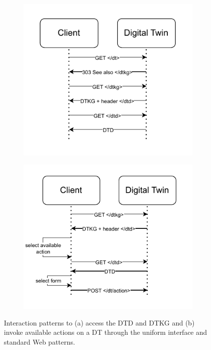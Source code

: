 \begin{figure}
    \centering
    \begin{subfigure}[t]{0.45\columnwidth}
        \centering
        \includegraphics[width=\textwidth]{figures/hwodt/dtddtkg.pdf}
        \caption{}
        \label{fig:sequence-dtddtkg}
    \end{subfigure}
    \hfill
    \begin{subfigure}[t]{0.46\columnwidth}
        \centering
        \includegraphics[width=\textwidth]{figures/hwodt/dtdactioncrop.pdf}
        \caption{}
        \label{fig:sequence-action}
    \end{subfigure}
    \caption{Interaction patterns to (a) access the \ac{DTD} and \ac{DTKG} and (b) invoke available actions on a \ac{DT} through the uniform interface and standard Web patterns.}
    \label{fig:sequence-interactions}
\end{figure}



